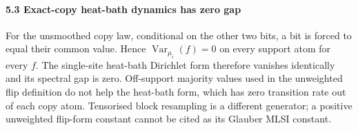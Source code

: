 \paragraph{5.3 Exact-copy heat-bath dynamics has zero gap}\label{exact-copy-heat-bath-dynamics-has-zero-gap}

For the unsmoothed copy law, conditional on the other two bits, a bit is forced to equal their common value. Hence \(\operatorname{Var}_{\mu_i}(f)=0\) on every support atom for every \(f\). The single-site heat-bath Dirichlet form therefore vanishes identically and its spectral gap is zero. Off-support majority values used in the unweighted flip definition do not help the heat-bath form, which has zero transition rate out of each copy atom. Tensorised block resampling is a different generator; a positive unweighted flip-form constant cannot be cited as its Glauber MLSI constant.
